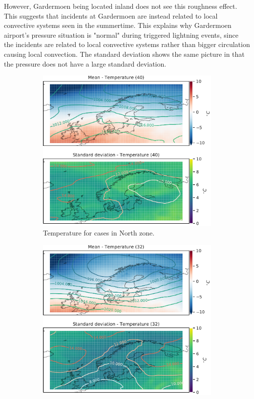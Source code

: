 However, Gardermoen being located inland does not see this roughness effect. This suggests that incidents at Gardermoen are instead related to local convective systems seen in the summertime. This explains why Gardermoen airport's pressure situation is "normal" during triggered lightning events, since the incidents are related to local convective systems rather than bigger circulation causing local convection. The standard deviation shows the same picture in that the pressure does not have a large standard deviation.

\begin{figure}
\begin{subfigure}[b]{0.49\textwidth}
    \centering
    \includegraphics[width=\textwidth]{Figures/TempNord.pdf}
    \caption{Temperature for cases in North zone.}
    \label{fig:NordTemperature}
\end{subfigure}
\begin{subfigure}[b]{0.49\textwidth}
    \centering
    \includegraphics[width=\textwidth]{Figures/TempNordvest.pdf}

\end{subfigure}
\end{figure}
